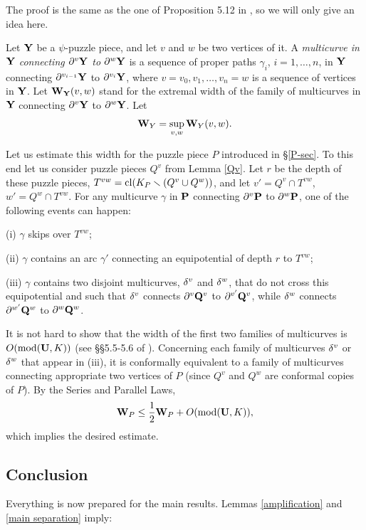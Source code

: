 The proof is the same as the one of Proposition 5.12 in \cite{decorations},
so we will only give an idea here. 

Let ${\mathbf{Y}}$ be a $\psi$-puzzle piece, and let $v$ and $w$ be two vertices of it.
A {\it multicurve in ${\mathbf{Y}}$ connecting $\partial^v{\mathbf{Y}}$ to $\partial^w{\mathbf{Y}}$} is a sequence of proper paths
$\gamma_i$, $i=1,\dots, n$,  in ${\mathbf{Y}}$ connecting $\partial^{v_{i-1}}{\mathbf{Y}}$ to $\partial^{v_i}{\mathbf{Y}}$,
where $v=v_0, v_1,\dots, v_n=w$ is a sequence of vertices in ${\mathbf{Y}}$.  
Let ${\mathbf{W}}_{\mathbf{Y}}(v, w)$ stand for the extremal width of the family of multicurves in ${\mathbf{Y}}$ 
connecting $\partial^v{\mathbf{Y}}$ to $\partial^w{\mathbf{Y}}$.
Let 
$$
    {\mathbf{W}}_Y =\sup_{v,w} {\mathbf{W}}_Y(v,w). 
$$

Let us estimate this width for the puzzle piece $P$ introduced in \S \ref{P-sec}.
To this end let us consider puzzle pieces $Q^v$ from Lemma \ref{Qv}. 
Let $r$ be the depth of these puzzle pieces,
$T^{vw}=\operatorname{cl}(K_P\smallsetminus (Q^v\cup Q^w))$, and let $v'=Q^v\cap T^{vw}$, $w'=Q^w\cap T^{vw}$. 
For any multicurve $\gamma$ in  ${\mathbf{P}}$ connecting $\partial^v {\mathbf{P}}$ to $\partial^w {\mathbf{P}}$, 
one of the following events can happen:

\ssk\nin (i) $\gamma$ skips over $T^{vw}$;

\ssk\nin (ii) $\gamma$ contains an arc $\gamma'$ connecting an equipotential of depth $r$ 
             to $T^{vw}$;

\ssk\nin (iii)  $\gamma$ contains two disjoint multicurves,
${\delta}^v$ and ${\delta}^w$, that do not cross this equipotential  and such that 
${\delta}^v$ connects $\partial^v{\mathbf{Q}}^v$ to $\partial^{v'}{\mathbf{Q}}^v$, while ${\delta}^w$ connects $\partial^{w'}{\mathbf{Q}}^w$ to $\partial^w{\mathbf{Q}}^w$. 

\ssk
It is not hard to show that the width of the first two families of multicurves is $O(\operatorname{mod}({\mathbf{U}},K))$
(see \S\S 5.5-5.6 of \cite{decorations} ). Concerning each family of multicurves ${\delta}^v$ or ${\delta}^w$
that appear  in (iii), it is conformally equivalent to a family of multicurves connecting appropriate
two vertices of $P$ (since $Q^v$ and $Q^w$ are conformal copies of $P$). By the Series and Parallel Laws,
$$
     {\mathbf{W}}_P \leq \frac 1{2} {\mathbf{W}}_P +O(\operatorname{mod}({\mathbf{U}}, K)),
$$
which implies the desired estimate. 

  
\subsection{Conclusion}\label{conclusion}

Everything is now prepared for the main results.
 Lemmas \ref{amplification} and \ref{main separation} imply:

